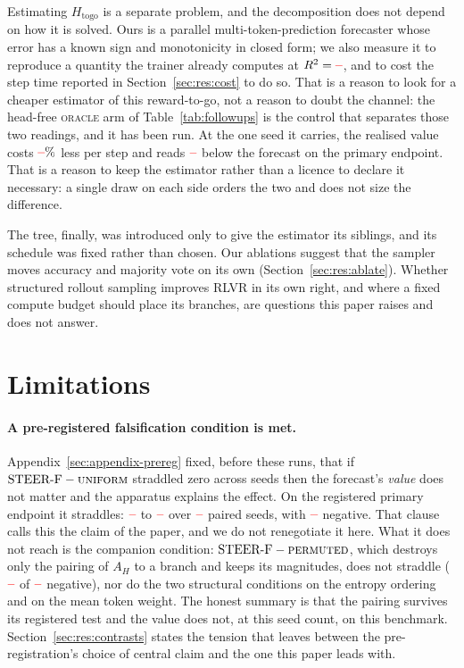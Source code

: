 \documentclass[11pt]{article}
\newcommand{\Htogo}{H_{\mathrm{togo}}}
\newcommand{\AH}{A_{H}}
\providecommand{\PENDING}{\textcolor{red}{\textbf{--}}}
\newcommand{\num}[1]{\ifcsname #1\endcsname\csname #1\endcsname\else\PENDING\fi}
\begin{document}
Estimating $\Htogo$ is a separate problem, and the decomposition does not depend on
how it is solved. Ours is a parallel multi-token-prediction forecaster whose error
has a known sign and monotonicity in closed form; we also measure it to reproduce a
quantity the trainer already computes at $R^2 = \num{Locrsq}$, and to cost the step
time reported in Section~\ref{sec:res:cost} to do so. That is a reason to look for a
cheaper estimator of this reward-to-go, not a reason to doubt the channel: the
head-free \textsc{oracle} arm of Table~\ref{tab:followups} is the control that
separates those two readings, and it has been run. At the one seed it carries, the
realised value costs $\num{Fsignedoraclesaving}\%$ less per step and reads
$\num{Fsignedoracleacc}$ below the forecast on the primary endpoint. That is a
reason to keep the estimator rather than a licence to declare it necessary: a single
draw on each side orders the two and does not size the difference.

The tree, finally, was introduced only to give the estimator its siblings, and its
schedule was fixed rather than chosen. Our ablations suggest that the sampler moves
accuracy and majority vote on its own (Section~\ref{sec:res:ablate}). Whether
structured rollout sampling improves RLVR in its own right, and where a fixed compute
budget should place its branches, are questions this paper raises and does not
answer.

\section*{Limitations}

\paragraph{A pre-registered falsification condition is met.}
Appendix~\ref{sec:appendix-prereg} fixed, before these runs, that if
$\text{STEER-F} - \textsc{uniform}$ straddled zero across seeds then the forecast's
\emph{value} does not matter and the apparatus explains the effect. On the registered
primary endpoint it straddles: $\num{CLosigneduniformacc}$ to
$\num{CHisigneduniformacc}$ over $\num{Nsigneduniform}$ paired seeds, with
$\num{CNegsigneduniformacc}$ negative. That clause calls this the claim of the paper,
and we do not renegotiate it here. What it does not reach is the companion condition:
$\text{STEER-F} - \textsc{permuted}$, which destroys only the pairing of $\AH$ to a
branch and keeps its magnitudes, does not straddle
($\num{CNegsignedpermutedacc}$ of $\num{Nsignedpermuted}$ negative), nor do the two
structural conditions on the entropy ordering and on the mean token weight. The
honest summary is that the pairing survives its registered test and the value does
not, at this seed count, on this benchmark. Section~\ref{sec:res:contrasts} states the
tension that leaves between the pre-registration's choice of central claim and the one
this paper leads with.
\end{document}
